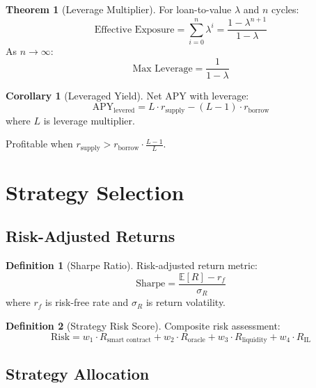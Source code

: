 \documentclass[11pt,a4paper]{article}
\theoremstyle{definition}
\newtheorem{definition}{Definition}
\newtheorem{theorem}{Theorem}
\newtheorem{corollary}{Corollary}
\begin{document}
\begin{theorem}[Leverage Multiplier]
For loan-to-value $\lambda$ and $n$ cycles:
\begin{equation}
\text{Effective Exposure} = \sum_{i=0}^{n} \lambda^i = \frac{1 - \lambda^{n+1}}{1 - \lambda}
\end{equation}
As $n \to \infty$:
\begin{equation}
\text{Max Leverage} = \frac{1}{1 - \lambda}
\end{equation}
\end{theorem}

\begin{corollary}[Leveraged Yield]
Net APY with leverage:
\begin{equation}
\text{APY}_{\text{levered}} = L \cdot r_{\text{supply}} - (L - 1) \cdot r_{\text{borrow}}
\end{equation}
where $L$ is leverage multiplier.
\end{corollary}

Profitable when $r_{\text{supply}} > r_{\text{borrow}} \cdot \frac{L-1}{L}$.

\section{Strategy Selection}

\subsection{Risk-Adjusted Returns}

\begin{definition}[Sharpe Ratio]
Risk-adjusted return metric:
\begin{equation}
\text{Sharpe} = \frac{\mathbb{E}[R] - r_f}{\sigma_R}
\end{equation}
where $r_f$ is risk-free rate and $\sigma_R$ is return volatility.
\end{definition}

\begin{definition}[Strategy Risk Score]
Composite risk assessment:
\begin{equation}
\text{Risk} = w_1 \cdot R_{\text{smart contract}} + w_2 \cdot R_{\text{oracle}} + w_3 \cdot R_{\text{liquidity}} + w_4 \cdot R_{\text{IL}}
\end{equation}
\end{definition}

\subsection{Strategy Allocation}
\end{document}
